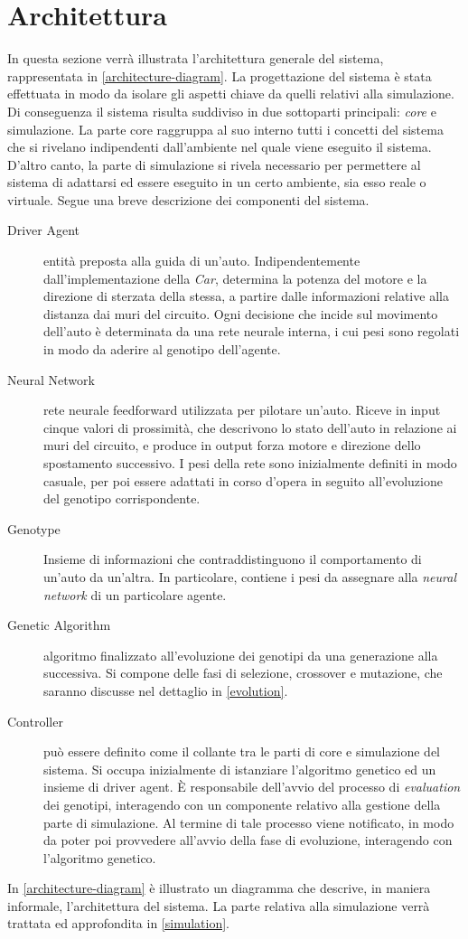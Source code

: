 \documentclass[a4paper,12pt]{article}
\begin{document}
\section{Architettura}
In questa sezione verrà illustrata l'architettura generale del sistema, rappresentata in \autoref{architecture-diagram}. La progettazione del sistema è stata effettuata in modo da isolare gli aspetti chiave da quelli relativi alla simulazione. Di conseguenza il sistema risulta suddiviso in due sottoparti principali: \emph{core} e simulazione. La parte core raggruppa al suo interno tutti i concetti del sistema che si rivelano indipendenti dall'ambiente nel quale viene eseguito il sistema. D'altro canto, la parte di simulazione si rivela necessario per permettere al sistema di adattarsi ed essere eseguito in un certo ambiente, sia esso reale o virtuale. Segue una breve descrizione dei componenti del sistema.
\begin{description}
	\item[Driver Agent] entità preposta alla guida di un'auto. Indipendentemente dall'implementazione della \emph{Car}, determina la potenza del motore e la direzione di sterzata della stessa, a partire dalle informazioni relative alla distanza dai muri del circuito. Ogni decisione che incide sul movimento dell'auto è determinata da una rete neurale interna, i cui pesi sono regolati in modo da aderire al genotipo dell'agente.
	\item[Neural Network] rete neurale feedforward utilizzata per pilotare un'auto. Riceve in input cinque valori di prossimità, che descrivono lo stato dell'auto in relazione ai muri del circuito, e produce in output forza motore e direzione dello spostamento successivo. I pesi della rete sono inizialmente definiti in modo casuale, per poi essere adattati in corso d'opera in seguito all'evoluzione del genotipo corrispondente.
	\item[Genotype] Insieme di informazioni che contraddistinguono il comportamento di un'auto da un'altra. In particolare, contiene i pesi da assegnare alla \emph{neural network} di un particolare agente.
	\item[Genetic Algorithm] algoritmo finalizzato all'evoluzione dei genotipi da una generazione alla successiva. Si compone delle fasi di selezione, crossover e mutazione, che saranno discusse nel dettaglio in \autoref{evolution}.
	\item[Controller] può essere definito come il collante tra le parti di core e simulazione del sistema. Si occupa inizialmente di istanziare l'algoritmo genetico ed un insieme di driver agent. È responsabile dell'avvio del processo di \emph{evaluation} dei genotipi, interagendo con un componente relativo alla gestione della parte di simulazione. Al termine di tale processo viene notificato, in modo da poter poi provvedere all'avvio della fase di evoluzione, interagendo con l'algoritmo genetico.
\end{description}
In \autoref{architecture-diagram} è illustrato un diagramma che descrive, in maniera informale, l'architettura del sistema. La parte relativa alla simulazione verrà trattata ed approfondita in \autoref{simulation}.
\end{document}
